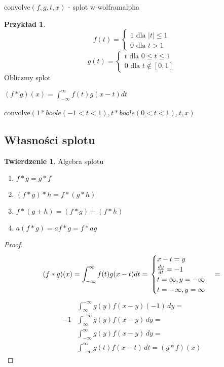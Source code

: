\documentclass{article}
\theoremstyle{definition}
\theoremstyle{definition}
\newtheorem{tw}{Twierdzenie}[subsection]
\theoremstyle{definition}
\newtheorem{pk}{Przykład}[subsection]
\theoremstyle{definition}
\begin{document}
convolve$(f,g,t,x)$ - splot w wolframalpha

\begin{pk}
    $$f(t)=
    \begin{cases}
        1 \text{ dla } |t|\leq 1\\
        0 \text{ dla } t > 1
    \end{cases}
    $$
    $$g(t)=
    \begin{cases}
        t \text{ dla } 0\leq t\leq 1\\
        0 \text{ dla } t\notin[0,1]
    \end{cases}
    $$
    Obliczmy splot\\
    \begin{center}
        $(f*g)(x) = \int_{-\infty}^{\infty} f(t)g(x-t) dt$
    \end{center}
    convolve$(1*boole(-1<t<1),t*boole(0<t<1),t,x)$
\end{pk}

\subsection{Własności splotu}

\begin{tw}
    Algebra splotu
    \begin{enumerate}
        \item $f*g=g*f$
        \item $(f*g)*h=f*(g*h)$
        \item $f*(g+h)=(f*g)+(f*h)$
        \item $a(f*g)=af*g=f*ag$
    \end{enumerate}
\end{tw}

\begin{proof}
    $$
    (f*g)(x) = \int_{-\infty}^{\infty} f(t)g(x-t) dt=\\
    \begin{cases}
        x-t=y\\ %
        \frac{dy}{dt}=-1\\
        t=\infty, y=-\infty\\
        t=-\infty, y=\infty
    \end{cases}=$$
    \begin{align}
        &\int_{\infty}^{-\infty} g(y)f(x-y) (-1) \,dy = \\
        -1 &\int_{\infty}^{-\infty} g(y)f(x-y) \,dy = \\
        &\int_{-\infty}^{\infty} g(y)f(x-y) \,dy = \\
        &\int_{-\infty}^{\infty} g(t)f(x-t) \,dt = (g*f)(x)
    \end{align}
\end{proof}
\end{document}
